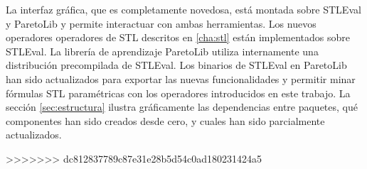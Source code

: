 La interfaz gráfica, que es completamente novedosa, está montada sobre STLEval y ParetoLib y permite interactuar con ambas herramientas.
Los nuevos operadores operadores de STL descritos en \ref{cha:stl} están implementados sobre STLEval. 
La librería de aprendizaje ParetoLib utiliza internamente una distribución precompilada de STLEval.
Los binarios de STLEval en ParetoLib han sido actualizados para exportar las nuevas funcionalidades y permitir minar fórmulas STL paramétricas con los operadores introducidos en este trabajo.
La sección \ref{sec:estructura} ilustra gráficamente las dependencias entre paquetes, qué componentes han sido creados desde cero, y cuales han sido parcialmente actualizados.


>>>>>>> dc812837789c87e31e28b5d54c0ad180231424a5
